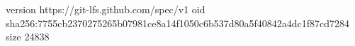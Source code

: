 version https://git-lfs.github.com/spec/v1
oid sha256:7755cb2370275265b07981ce8a14f1050c6b537d80a5f40842a4dc1f87cd7284
size 24838
